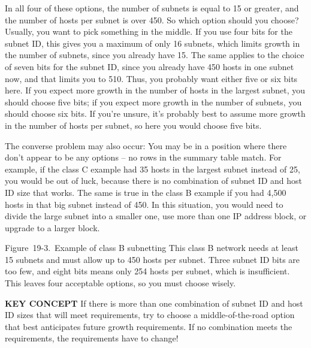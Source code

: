 In all four of these options, the number of subnets is equal to 15 or
greater, and the number of hosts per subnet is over 450. So which option
should you choose? Usually, you want to pick something in the middle. If
you use four bits for the subnet ID, this gives you a maximum of only 16
subnets, which limits growth in the number of subnets, since you already
have 15. The same applies to the choice of seven bits for the subnet ID,
since you already have 450 hosts in one subnet now, and that limits you
to 510. Thus, you probably want either five or six bits here. If you
expect more growth in the number of hosts in the largest subnet, you
should choose five bits; if you expect more growth in the number of
subnets, you should choose six bits. If you're unsure, it's probably
best to assume more growth in the number of hosts per subnet, so here
you would choose five bits.

The converse problem may also occur: You may be in a position where
there don't appear to be any options -- no rows in the summary table
match. For example, if the class C example had 35 hosts in the largest
subnet instead of 25, you would be out of luck, because there is no
combination of subnet ID and host ID size that works. The same is true
in the class B example if you had 4,500 hosts in that big subnet instead
of 450. In this situation, you would need to divide the large subnet
into a smaller one, use more than one IP address block, or upgrade to a
larger block.

\protect\hypertarget{ch19s02.htmlux5cux23example_of_class_b_subnetting_this_class}{}{}

\protect\hypertarget{ch19s02.htmlux5cux23I_mediaobject5_d1e20701}{}{}

Figure~19-3.~Example of class B subnetting This class B network needs at
least 15 subnets and must allow up to 450 hosts per subnet. Three subnet
ID bits are too few, and eight bits means only 254 hosts per subnet,
which is insufficient. This leaves four acceptable options, so you must
choose wisely.


{\textbf{KEY CONCEPT}} If there is more than one combination of subnet
ID and host ID sizes that will meet requirements, try to choose a
middle-of-the-road option that best anticipates future growth
requirements. If no combination meets the requirements, the requirements
have to change!

\protect\hypertarget{ch19s03.html}{}{}

